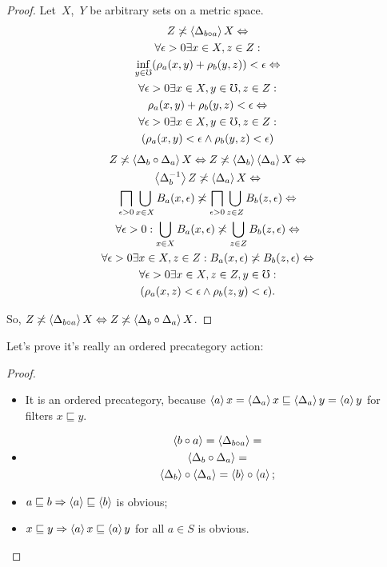 \begin{proof}
Let~$X$,~$Y$ be arbitrary sets on a metric space.
\begin{multline*}
Z\not\asymp\left\langle \Delta_{b\circ a}\right\rangle X \Leftrightarrow \\
\forall\epsilon>0\exists x\in X,z\in Z:\\\inf_{y\in\mho}(\rho_a(x,y)+\rho_b(y,z))<\epsilon \Leftrightarrow \\
\forall\epsilon>0\exists x\in X,y\in\mho,z\in Z:\\\rho_a(x,y)+\rho_b(y,z)<\epsilon \Leftrightarrow \\
\forall\epsilon>0\exists x\in X,y\in\mho,z\in Z:\\(\rho_a(x,y)<\epsilon\land\rho_b(y,z)<\epsilon)
\end{multline*}
\begin{multline*}
Z\not\asymp\left\langle \Delta_b\circ\Delta_a\right\rangle X \Leftrightarrow
Z\not\asymp\left\langle \Delta_b\right\rangle\left\langle \Delta_a\right\rangle X\Leftrightarrow\\
\left\langle \Delta_b^{-1}\right\rangle Z\not\asymp\left\langle \Delta_a\right\rangle X \Leftrightarrow\\
\bigsqcap_{\epsilon>0}\bigcup_{x\in X}B_a(x,\epsilon) \not\asymp\bigsqcap_{\epsilon>0}\bigcup_{z\in Z}B_b(z,\epsilon) \Leftrightarrow \\
\forall\epsilon>0:\bigcup_{x\in X}B_a(x,\epsilon) \not\asymp\bigcup_{z\in Z}B_b(z,\epsilon) \Leftrightarrow \\
\forall\epsilon>0\exists x\in X,z\in Z:B_a(x,\epsilon)\not\asymp B_b(z,\epsilon) \Leftrightarrow \\
\forall\epsilon>0\exists x\in X,z\in Z,y\in\mho:\\(\rho_a(x,z)<\epsilon\land\rho_b(z,y)<\epsilon).
\end{multline*}

So, $Z\not\asymp\left\langle \Delta_{b\circ a}\right\rangle X \Leftrightarrow Z\not\asymp\left\langle \Delta_b\circ\Delta_a\right\rangle X$.
\end{proof}

Let's prove it's really an ordered precategory action:

\begin{proof}
~
\begin{itemize}
\item It is an ordered precategory, because
$\left\langle a\right\rangle x = \left\langle \Delta_a\right\rangle x \sqsubseteq \left\langle \Delta_a\right\rangle y = \left\langle a\right\rangle y$ 
for filters $x\sqsubseteq y$.

\item
\begin{multline*}
\left\langle b\circ a\right\rangle = \left\langle \Delta_{b\circ a}\right\rangle = \\ \left\langle \Delta_b\circ\Delta_a\right\rangle = \\ \left\langle \Delta_b\right\rangle\circ\left\langle \Delta_a\right\rangle = \left\langle b\right\rangle\circ\left\langle a\right\rangle;
\end{multline*}
\item $a\sqsubseteq b\Rightarrow \left\langle a\right\rangle\sqsubseteq \left\langle b\right\rangle$ is obvious;
\item $x\sqsubseteq y\Rightarrow\left\langle a\right\rangle x\sqsubseteq \left\langle a\right\rangle y$ for all $a\in S$ is obvious.
\end{itemize}
\end{proof}

